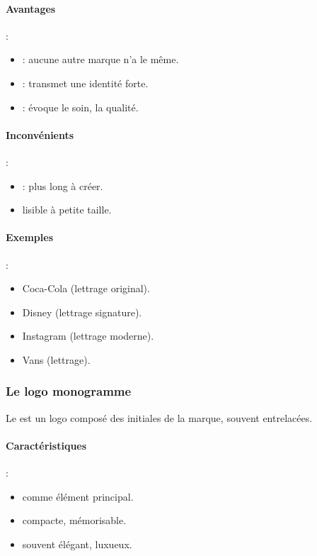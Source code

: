 \paragraph{Avantages} :
\begin{itemize}
    \item {} : aucune autre marque n'a le même.
    \item {} : transmet une identité forte.
    \item {} : évoque le soin, la qualité.
\end{itemize}

\paragraph{Inconvénients} :
\begin{itemize}
    \item {} : plus long à créer.
    \item {} lisible à petite taille.
\end{itemize}

\paragraph{Exemples} :
\begin{itemize}
    \item Coca-Cola (lettrage original).
    \item Disney (lettrage signature).
    \item Instagram (lettrage moderne).
    \item Vans (lettrage).
\end{itemize}

\subsubsection{Le logo monogramme}

Le  est un logo composé des initiales de la marque, souvent entrelacées.

\paragraph{Caractéristiques} :
\begin{itemize}
    \item {} comme élément principal.
    \item {} compacte, mémorisable.
    \item {} souvent élégant, luxueux.
\end{itemize}

